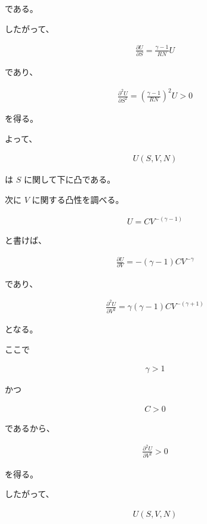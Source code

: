 \documentclass[platex,dvipdfmx,a4paper]{jsarticle}
\begin{document}
である。

したがって、

\begin{align*}
\frac{\partial U}{\partial S}
=
\frac{\gamma-1}{RN}U
\end{align*}

であり、

\begin{align*}
\frac{\partial^2U}{\partial S^2}
=
\left(
\frac{\gamma-1}{RN}
\right)^2
U
>
0
\end{align*}

を得る。

よって、

\begin{align*}
U(S,V,N)
\end{align*}

は $S$ に関して下に凸である。

次に $V$ に関する凸性を調べる。

\begin{align*}
U
=
C
V^{-(\gamma-1)}
\end{align*}

と書けば、

\begin{align*}
\frac{\partial U}{\partial V}
=
-(\gamma-1)
CV^{-\gamma}
\end{align*}

であり、

\begin{align*}
\frac{\partial^2U}{\partial V^2}
=
\gamma(\gamma-1)
CV^{-(\gamma+1)}
\end{align*}

となる。

ここで

\begin{align*}
\gamma>1
\end{align*}

かつ

\begin{align*}
C>0
\end{align*}

であるから、

\begin{align*}
\frac{\partial^2U}{\partial V^2}
>
0
\end{align*}

を得る。

したがって、

\begin{align*}
U(S,V,N)
\end{align*}
\end{document}
